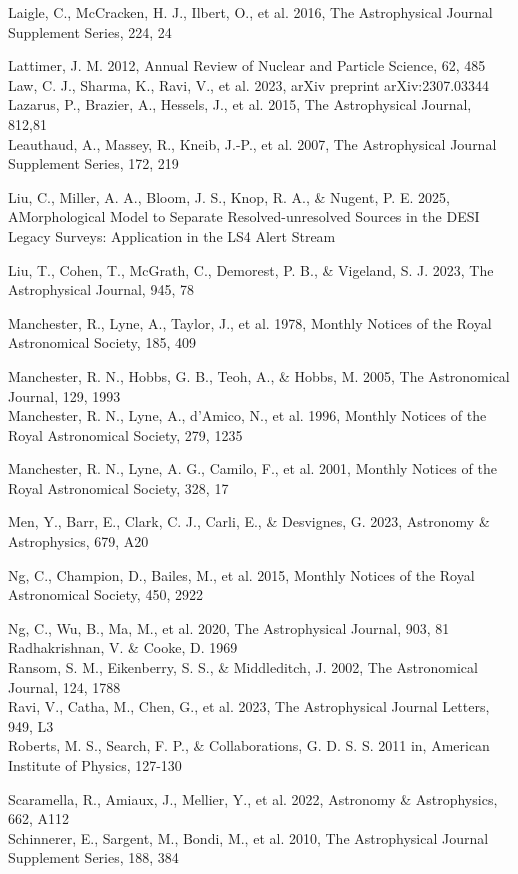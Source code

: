 \documentclass[10pt]{article}
\begin{document}
Laigle, C., McCracken, H. J., Ilbert, O., et al. 2016, The Astrophysical Journal Supplement Series, 224, 24

Lattimer, J. M. 2012, Annual Review of Nuclear and Particle Science, 62, 485\\
Law, C. J., Sharma, K., Ravi, V., et al. 2023, arXiv preprint arXiv:2307.03344\\
Lazarus, P., Brazier, A., Hessels, J., et al. 2015, The Astrophysical Journal, 812,81\\
Leauthaud, A., Massey, R., Kneib, J.-P., et al. 2007, The Astrophysical Journal Supplement Series, 172, 219

Liu, C., Miller, A. A., Bloom, J. S., Knop, R. A., \& Nugent, P. E. 2025, AMorphological Model to Separate Resolved-unresolved Sources in the DESI Legacy Surveys: Application in the LS4 Alert Stream

Liu, T., Cohen, T., McGrath, C., Demorest, P. B., \& Vigeland, S. J. 2023, The Astrophysical Journal, 945, 78

Manchester, R., Lyne, A., Taylor, J., et al. 1978, Monthly Notices of the Royal Astronomical Society, 185, 409

Manchester, R. N., Hobbs, G. B., Teoh, A., \& Hobbs, M. 2005, The Astronomical Journal, 129, 1993\\
Manchester, R. N., Lyne, A., d'Amico, N., et al. 1996, Monthly Notices of the Royal Astronomical Society, 279, 1235

Manchester, R. N., Lyne, A. G., Camilo, F., et al. 2001, Monthly Notices of the Royal Astronomical Society, 328, 17

Men, Y., Barr, E., Clark, C. J., Carli, E., \& Desvignes, G. 2023, Astronomy \& Astrophysics, 679, A20

Ng, C., Champion, D., Bailes, M., et al. 2015, Monthly Notices of the Royal Astronomical Society, 450, 2922

Ng, C., Wu, B., Ma, M., et al. 2020, The Astrophysical Journal, 903, 81\\
Radhakrishnan, V. \& Cooke, D. 1969\\
Ransom, S. M., Eikenberry, S. S., \& Middleditch, J. 2002, The Astronomical Journal, 124, 1788\\
Ravi, V., Catha, M., Chen, G., et al. 2023, The Astrophysical Journal Letters, 949, L3\\
Roberts, M. S., Search, F. P., \& Collaborations, G. D. S. S. 2011 in, American Institute of Physics, 127-130

Scaramella, R., Amiaux, J., Mellier, Y., et al. 2022, Astronomy \& Astrophysics, 662, A112\\
Schinnerer, E., Sargent, M., Bondi, M., et al. 2010, The Astrophysical Journal Supplement Series, 188, 384
\end{document}
